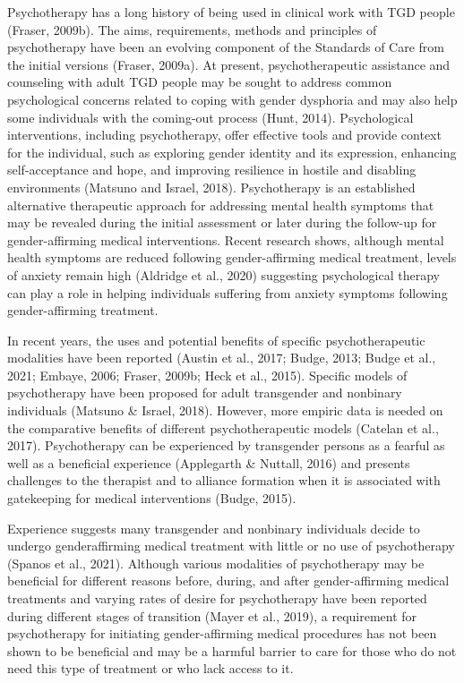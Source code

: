 \documentclass[
]{book}
\begin{document}
Psychotherapy has a long history of being used
in clinical work with TGD people (Fraser, 2009b).
The aims, requirements, methods and principles
of psychotherapy have been an evolving component of the Standards of Care from the initial
versions (Fraser, 2009a). At present, psychotherapeutic assistance and counseling with adult TGD
people may be sought to address common psychological concerns related to coping with gender
dysphoria and may also help some individuals with
the coming-out process (Hunt, 2014). Psychological
interventions, including psychotherapy, offer effective tools and provide context for the individual,
such as exploring gender identity and its expression, enhancing self-acceptance and hope, and
improving resilience in hostile and disabling environments (Matsuno and Israel, 2018). Psychotherapy
is an established alternative therapeutic approach
for addressing mental health symptoms that may
be revealed during the initial assessment or later
during the follow-up for gender-affirming medical
interventions. Recent research shows, although
mental health symptoms are reduced following
gender-affirming medical treatment, levels of anxiety remain high (Aldridge et al., 2020) suggesting
psychological therapy can play a role in helping
individuals suffering from anxiety symptoms following gender-affirming treatment.

In recent years, the uses and potential benefits
of specific psychotherapeutic modalities have
been reported (Austin et al., 2017; Budge, 2013;
Budge et al., 2021; Embaye, 2006; Fraser, 2009b;
Heck et al., 2015). Specific models of psychotherapy have been proposed for adult transgender
and nonbinary individuals (Matsuno \& Israel,
2018). However, more empiric data is needed on
the comparative benefits of different psychotherapeutic models (Catelan et al., 2017).
Psychotherapy can be experienced by transgender
persons as a fearful as well as a beneficial experience (Applegarth \& Nuttall, 2016) and presents
challenges to the therapist and to alliance formation when it is associated with gatekeeping for
medical interventions (Budge, 2015).

Experience suggests many transgender and nonbinary individuals decide to undergo genderaffirming medical treatment with little or no use
of psychotherapy (Spanos et al., 2021). Although
various modalities of psychotherapy may be beneficial for different reasons before, during, and after
gender-affirming medical treatments and varying
rates of desire for psychotherapy have been reported
during different stages of transition (Mayer et al.,
2019), a requirement for psychotherapy for initiating gender-affirming medical procedures has not
been shown to be beneficial and may be a harmful
barrier to care for those who do not need this type
of treatment or who lack access to it.
\end{document}
